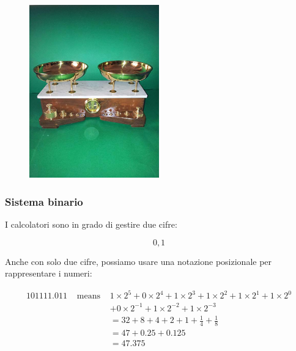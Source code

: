 \documentclass[xcolor={table}]{beamer}
\begin{document}
\subsection{}
\begin{frame}
   \frametitle{}

    \begin{figure}[h]
	\begin{center}
	\includegraphics[width=0.5\textwidth]{img/bilancia}
	\end{center}
	\end{figure}
   
\end{frame}

\begin{frame}
   \frametitle{Sistema binario}
   
   I calcolatori sono in grado di gestire due cifre:
   
   $$0, 1$$
   
   Anche con solo due cifre, possiamo usare una notazione posizionale per rappresentare i numeri:
   
   {\small
	\begin{eqnarray*}
	101 111.011 &\mbox{ means } & 1 \times 2^5  + 0\times 2^4 + 1\times 2^3 + 1\times 2^2 + 1\times 2^1 +1 \times 2^0\\
	&&  + 0\times 2^{-1} + 1\times 2^{-2} + 1\times 2^{-3}\\
	&&= 32 + 8 + 4 + 2 + 1 + \frac{1}{4} + \frac{1}{8}\\
	&&= 47 + 0.25 + 0.125 \\
	&& = 47.375
	\end{eqnarray*}}
   
\end{frame}
\end{document}
